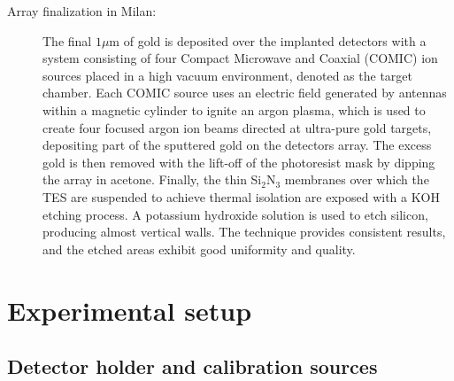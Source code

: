 \begin{description}
\item[Array finalization in Milan:] The final $1\mu$m of gold is deposited over the implanted detectors with a system
    consisting of four Compact Microwave and Coaxial (COMIC) ion sources placed in a high
vacuum environment, denoted as the target chamber. Each COMIC source uses an electric field generated by antennas within a magnetic cylinder to ignite
an argon plasma, which is used to create four focused argon ion beams directed at ultra-pure gold targets, depositing
part of the sputtered gold on the detectors array. The excess gold is then removed with the lift-off of the
photoresist mask by dipping the array in acetone. 
Finally, the thin Si$_2$N$_3$ membranes over which the TES are suspended to achieve thermal isolation are exposed with a KOH
etching process. A potassium hydroxide solution is used to etch silicon, producing almost vertical
walls. The technique provides consistent results, and the etched areas exhibit good uniformity and quality.
\end{description}





\section{Experimental setup}\label{sec:setup}
\subsection{Detector holder and calibration sources}\label{sec:holder}

